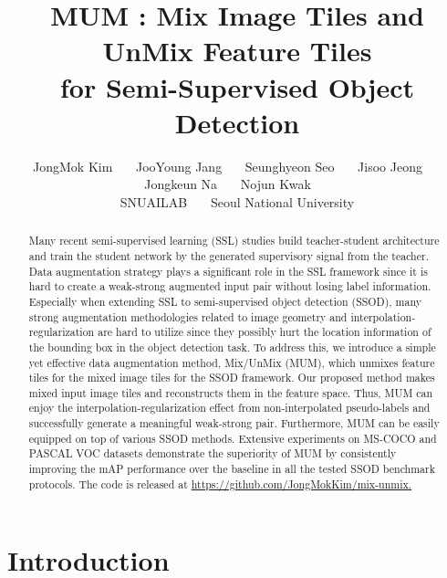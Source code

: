 \documentclass[10pt,twocolumn,letterpaper]{article}
\begin{document}
\title{MUM : Mix Image Tiles and UnMix Feature Tiles \\ for Semi-Supervised Object Detection}

\author{
JongMok Kim~~~
JooYoung Jang~~~
Seunghyeon Seo~~~
Jisoo Jeong~~~
Jongkeun Na~~~
Nojun Kwak~~~
\smallskip
\\
SNUAILAB~~~
Seoul National University
}

\maketitle

\begin{abstract}
Many recent semi-supervised learning (SSL) studies build teacher-student architecture and train the student network by the generated supervisory signal from the teacher.
Data augmentation strategy plays a significant role in the SSL framework since it is hard to create a weak-strong augmented input pair without losing label information.
Especially when extending SSL to semi-supervised object detection (SSOD), many strong augmentation methodologies related to image geometry and interpolation-regularization are hard to utilize since they possibly hurt the location information of the bounding box in the object detection task. 
To address this, we introduce a simple yet effective data augmentation method, Mix/UnMix (MUM), 
which unmixes feature tiles for the mixed image tiles for the SSOD framework.
Our proposed method makes mixed input image tiles and reconstructs them in the feature space.
Thus, MUM can enjoy the interpolation-regularization effect from non-interpolated pseudo-labels and successfully generate a meaningful weak-strong pair.
Furthermore, MUM can be easily equipped on top of various SSOD methods.
Extensive experiments on MS-COCO and PASCAL VOC datasets demonstrate the superiority of MUM by consistently improving the mAP performance over the baseline in all the tested SSOD benchmark protocols. 
The code is released at \href{https://github.com/JongMokKim/mix-unmix}{https://github.com/JongMokKim/mix-unmix.}

\end{abstract}


\section{Introduction}
\label{sec:intro}
\end{document}
